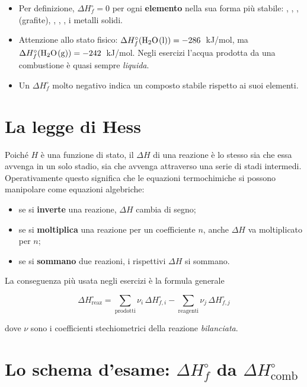 \documentclass[11pt, a4paper, openright]{book}
\begin{document}
\begin{itemize}
  \item Per definizione, $\Delta H^\circ_f = 0$ per ogni \textbf{elemento} nella sua forma
        più stabile: , , ,  (grafite), ,
        , , i metalli solidi.
  \item Attenzione allo stato fisico: $\Delta H^\circ_f(\ce{H2O(l)}) = -286$~kJ/mol, ma
        $\Delta H^\circ_f(\ce{H2O(g)}) = -242$~kJ/mol. Negli esercizi l'acqua prodotta da
        una combustione è quasi sempre \emph{liquida}.
  \item Un $\Delta H^\circ_f$ molto negativo indica un composto stabile rispetto ai suoi
        elementi.
\end{itemize}

\section{La legge di Hess}

Poiché $H$ è una funzione di stato, il $\Delta H$ di una reazione è lo stesso sia che essa
avvenga in un solo stadio, sia che avvenga attraverso una serie di stadi intermedi.
Operativamente questo significa che le equazioni termochimiche si possono manipolare come
equazioni algebriche:

\begin{itemize}
  \item se si \textbf{inverte} una reazione, $\Delta H$ cambia di segno;
  \item se si \textbf{moltiplica} una reazione per un coefficiente $n$, anche $\Delta H$
        va moltiplicato per $n$;
  \item se si \textbf{sommano} due reazioni, i rispettivi $\Delta H$ si sommano.
\end{itemize}

La conseguenza più usata negli esercizi è la formula generale

\begin{equation}
  \Delta H^\circ_{\text{reaz}} = \sum_{\text{prodotti}} \nu_i \, \Delta H^\circ_{f,i}
                               - \sum_{\text{reagenti}} \nu_j \, \Delta H^\circ_{f,j}
  \label{eq:hess}
\end{equation}

dove $\nu$ sono i coefficienti stechiometrici della reazione \emph{bilanciata}.


\section{Lo schema d'esame: $\Delta H^\circ_f$ da $\Delta H^\circ_{\text{comb}}$}
\end{document}
